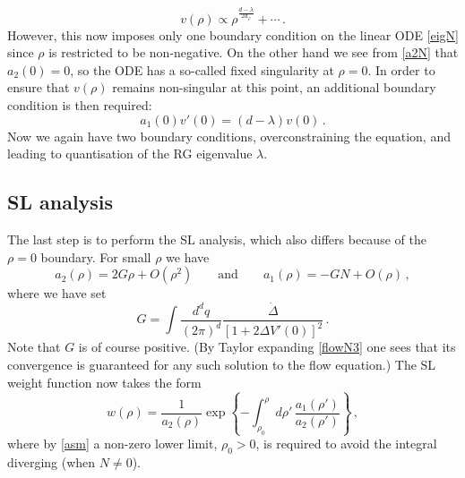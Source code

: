 \documentclass[11pt,a4paper]{article}
\numberwithin{figure}{section}
\numberwithin{equation}{section}
\newcommand{\be}{\begin{equation}}
\newcommand{\ee}{\end{equation}}
\newcommand{\ph}{\varphi}
\begin{document}
\be \label{asympvN} v(\rho) \propto \rho^{\frac{d-\lambda}{2d_\ph}} +\cdots\,. \ee
However, this now imposes only one boundary condition on the linear ODE \eqref{eigN} since $\rho$ is restricted to be non-negative. On the other hand we see from \eqref{a2N} that $a_2(0)=0$, so the ODE has a so-called fixed singularity at $\rho=0$. In order to ensure that $v(\rho)$ remains non-singular at this point, an additional boundary condition is then required:
\be\label{bc0}  a_1(0)v'(0)=(d-\lambda) v(0) \,.\ee 
Now we again have two boundary conditions, overconstraining the equation, and leading to quantisation of the RG eigenvalue $\lambda$.

\subsection{SL analysis}

The last step is to perform the SL analysis, which also differs because of the $\rho=0$ boundary. For small $\rho$ we have 
\be \label{asm} a_2(\rho) =2G\rho+O(\rho^2)\qquad\text{and}\qquad a_1(\rho) =-GN+O(\rho)\,, \ee
where we have set
\be \label{G}
G= \int \frac{d^d q}{(2\pi)^d} \frac{\dot{\Delta}}{\left[ 1 + 2 \Delta V'(0) \right]^2}  \,.
\ee
Note that $G$ is of course positive. (By Taylor expanding \eqref{flowN3} one sees that its convergence is guaranteed for any such solution to the flow equation.) 
The SL weight function now takes the form
\begin{equation} \label{weight_N}
    w(\rho) = \frac{1}{a_2(\rho)} \exp \left\{ - \int^\rho_{\rho_0}\!\!\!\! d\rho'\, \frac{a_1(\rho')}{a_2(\rho')} \right\} \,,
\end{equation}
where by \eqref{asm} a non-zero lower limit, $\rho_0>0$, is required to avoid the integral diverging (when $N\ne0$).
\end{document}
